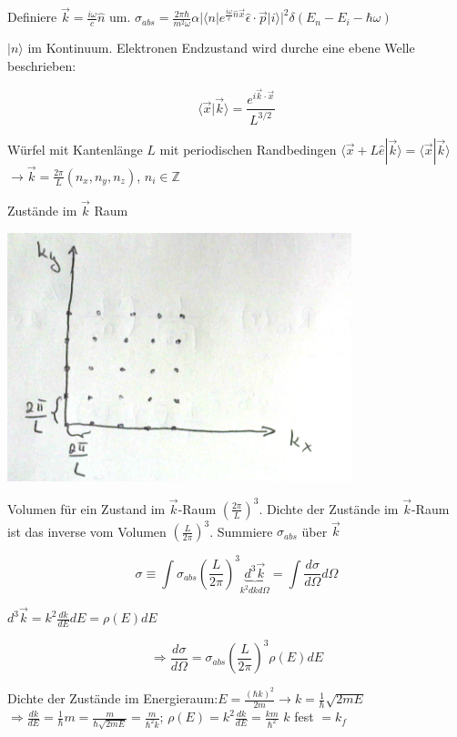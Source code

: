 Definiere \(\vec k=\frac{i\omega}{c}\hat n\) um. \(\sigma_{abs}=\frac{2\pi\hbar}{m^2\omega}\alpha |\langle n|e^{\frac{i\omega}{c}\hat n\vec x}\hat \epsilon\cdot\vec p|i\rangle|^2\delta(E_n-E_i-\hbar\omega)\)

\(|n\rangle\) im Kontinuum. Elektronen Endzustand wird durche eine ebene Welle beschrieben:

\[ \langle \vec x|\vec k\rangle = \frac{e^{i\vec k\cdot\vec x}}{L^{3/2}}\]

Würfel mit Kantenlänge \(L\) mit periodischen Randbedingen \(\langle \vec x + L\hat e|\vec k\rangle =\langle \vec x|\vec k\rangle \) \(\rightarrow \vec k = \frac{2\pi}{L}(n_x,n_y,n_z)\), \(n_i\in \mathbb Z\)

Zustände im \(\vec k\) Raum




\includegraphics[width=0.75\textwidth]{kap03_11.png}



Volumen für ein Zustand im \(\vec k\)-Raum \(\left( \frac{2\pi}{L}\right)^3\). Dichte der Zustände im \(\vec k\)-Raum ist das inverse vom Volumen \(\left( \frac{L}{2\pi}\right)^3\). Summiere \(\sigma_{abs}\) über \(\vec k\)

\[\sigma \equiv \int \sigma_{abs} \left( \frac{L}{2\pi}\right)^3 \underbrace{d^3\vec k}_{k^2 dkd\Omega} = \int \frac{d\sigma}{d\Omega}d\Omega\]

\(d^3\vec k = k^2\frac{dk}{dE}dE = \rho(E)dE\)

\[\Rightarrow \frac{d\sigma}{d\Omega} = \sigma_{abs} \left( \frac{L}{2\pi}\right)^3\rho(E)dE\]

Dichte der Zustände im Energieraum:\(E=\frac{(\hbar k)^2}{2m} \rightarrow k=\frac{1}{\hbar}\sqrt{2mE}\) \(\Rightarrow \frac{dk}{dE} = \frac{1}{\hbar}m=\frac{m}{\hbar \sqrt{2mE}}=\frac{m}{\hbar^2k}\); \(\rho(E) = k^2 \frac{dk}{dE} = \frac{km}{\hbar^2}\) \(k\) fest \(=k_f\)


